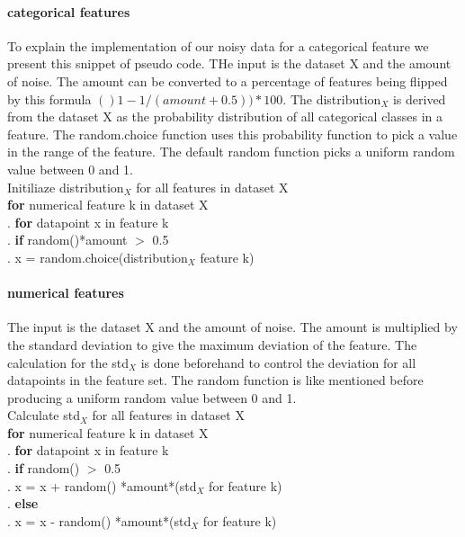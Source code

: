 \documentclass[a4paper,10pt]{article}
\begin{document}
\paragraph{categorical features \newline}
To explain the implementation of our noisy data for a categorical feature we present this snippet of pseudo code. THe input is the dataset X and the amount of noise. The amount can be converted to a percentage of features being flipped by this formula $()1-1/(amount+0.5))*100$. The distribution$_X$ is derived from the dataset X as the probability distribution of all categorical classes in a feature. The random.choice function uses this probability function to pick a value in the range of the feature. The default random function picks a uniform random value between 0 and 1.  \\
Initiliaze distribution$_X$ for all features in dataset X\\
\textbf{for} numerical feature k in dataset X\\
.\hspace{1cm} \textbf{for} datapoint x in feature k\\
.\hspace{2cm} \textbf{if} random()*amount $>$ 0.5 \\	
.\hspace{3cm} x = random.choice(distribution$_X$ feature k) 
\\

\paragraph{numerical features \newline}
The input is the dataset X and the amount of noise. The amount is multiplied by the standard deviation to give the maximum deviation of the feature. The calculation for the std$_X$ is done beforehand to control the deviation for all datapoints in the feature set. The random function is like mentioned before producing a uniform random value between 0 and 1.\\
Calculate std$_X$ for all features in dataset X\\
\textbf{for} numerical feature k in dataset X\\
.\hspace{1cm} \textbf{for} datapoint x in feature k\\
.\hspace{2cm} \textbf{if} random() $>$ 0.5 \\	
.\hspace{3cm} x = x + random() *amount*(std$_X$ for feature k)\\
.\hspace{2cm} \textbf{else}  \\	
.\hspace{3cm} x = x - random() *amount*(std$_X$ for feature k) 
\\
\end{document}
